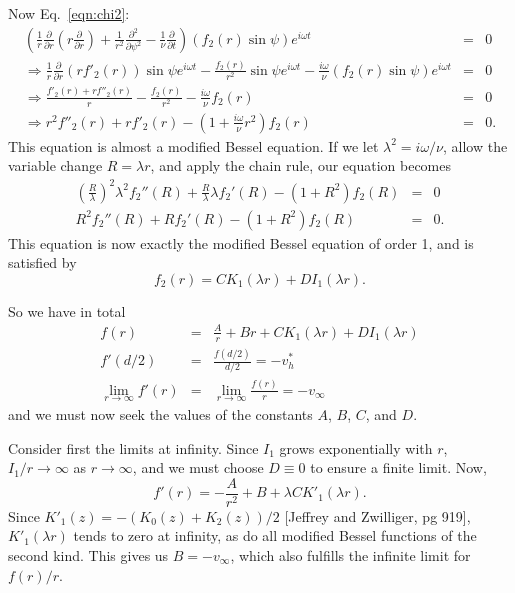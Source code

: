 \documentclass[11pt]{amsart}
\newcommand{\vinf}{v_{\infty}}
\newcommand{\om}{\omega}
\newcommand{\bees}[1]{\begin{equation*} #1 \end{equation*}}
\newcommand{\baas}[1]{\begin{eqnarray*} #1 \end{eqnarray*}}
\newcommand{\pd}[2]{\ensuremath{\frac{\partial #1}{\partial #2}}}
\newcommand{\pdd}[2]{\ensuremath{\frac{\partial^2 #1}{\partial {#2}^2}}}
\begin{document}
Now Eq.~\ref{eqn:chi2}:
\baas{
\left( \frac{1}{r}\pd{}{r}\left(r\pd{}{r}\right) + \frac{1}{r^2}\pdd{}{\psi} - \frac{1}{\nu} \pd{}{t} \right) \left(f_2(r)\sin\psi\right) e^{i \om t} &=& 0 \\
\Rightarrow \frac{1}{r}\pd{}{r}\left(rf'_2(r)\right)\sin\psi e^{i \om t} - \frac{f_2(r)}{r^2}\sin\psi e^{i \om t} - \frac{i \om}{\nu} \left(f_2(r)\sin\psi\right) e^{i \om t} &=& 0 \\
\Rightarrow \frac{f'_2(r) + rf''_2(r)}{r} - \frac{f_2(r)}{r^2} - \frac{i \om}{\nu} f_2(r) &=& 0 \\
\Rightarrow r^2f''_2(r) + rf'_2(r) - (1 + \frac{i \om}{\nu}r^2) f_2(r) &=& 0.
}
This equation is almost a modified Bessel equation. If we let $\lambda^2 = i\om/\nu$, allow the variable change $R = \lambda r$, and apply the chain rule, our equation becomes
\baas{
\left(\frac{R}{\lambda}\right)^2 \lambda^2 f_2''(R) + \frac{R}{\lambda}\lambda f_2'(R) - (1 + R^2) f_2(R) &=& 0 \\
R^2f_2''(R) + R f_2'(R) - (1 + R^2) f_2(R) &=& 0.
}
This equation is now exactly the modified Bessel equation of order 1, and is satisfied by
\bees{
f_2(r) = C K_1(\lambda r ) + D I_1(\lambda r).
}

So we have in total
\baas{
f(r) &=& \frac{A}{r} + Br + C K_1(\lambda r ) + D I_1(\lambda r) \\
f'(d/2) &=& \frac{f(d/2)}{d/2} = -v_h^* \\
\lim\limits_{r\to\infty} f'(r) &=&  \lim\limits_{r\to\infty} \frac{f(r)}{r} =-\vinf
 }
and we must now seek the values of the constants $A$, $B$, $C$, and $D$. 

Consider first the limits at infinity. Since $I_1$ grows exponentially with $r$, $I_1/r \to \infty$ as $r \to \infty$, and we must choose $D \equiv 0$ to ensure a finite limit. Now,
\bees{
f'(r) = -\frac{A}{r^2} + B + \lambda C K'_1(\lambda r).
} 
Since $K'_1(z) = -(K_0(z) + K_2(z))/2$ [Jeffrey and Zwilliger, pg 919], $K'_1(\lambda r)$ tends to zero at infinity, as do all modified Bessel functions of the second kind. This gives us $B = -\vinf$, which also fulfills the infinite limit for $f(r)/r$.
\end{document}
